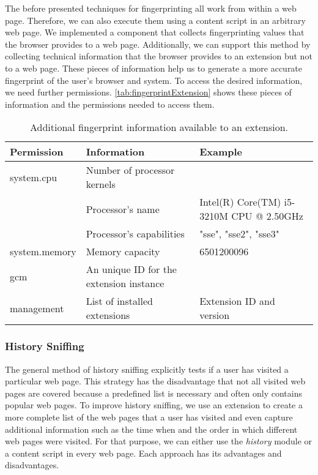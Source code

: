 	The before presented techniques for fingerprinting all work from within a web page. Therefore, we can also execute them using a content script in an arbitrary web page. We implemented a component that collects fingerprinting values that the browser provides to a web page. Additionally, we can support this method by collecting technical information that the browser provides to an extension but not to a web page. These pieces of information help us to generate a more accurate fingerprint of the user's browser and system. To access the desired information, we need further permissions. \autoref{tab:fingerprintExtension} shows these pieces of information and the permissions needed to access them. 
	
	\begin{table}[h]
		\begin{tabular}{|l|l|l|} \hline
			\textbf{Permission} & \textbf{Information} & \textbf{Example} \\ \hline
			system.cpu & Number of processor kernels & \\
			& Processor's name & Intel(R) Core(TM) i5-3210M CPU @ 2.50GHz \\
			& Processor's capabilities & "sse", "sse2", "sse3"  \\ \hline
			system.memory & Memory capacity & 6501200096 \\ \hline
			gcm & An unique ID for the extension instance & \\ \hline
			management & List of installed extensions & Extension ID and version \\ \hline
		\end{tabular}
		\caption{Additional fingerprint information available to an extension.}
		\label{tab:fingerprintExtension}
	\end{table} 
	
\subsubsection{History Sniffing}
\label{sec:historySniffing}

	The general method of history sniffing explicitly tests if a user has visited a particular web page. This strategy has the disadvantage that not all visited web pages are covered because a predefined list is necessary and often only contains popular web pages. To improve history sniffing, we use an extension to create a more complete list of the web pages that a user has visited and even capture additional information such as the time when and the order in which different web pages were visited. For that purpose, we can either use the \textit{history} module or a content script in every web page. Each approach has its advantages and disadvantages. 
	
